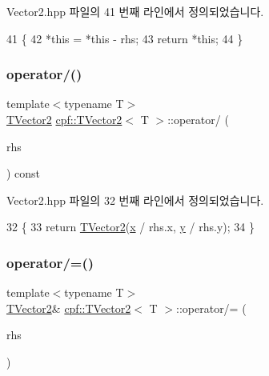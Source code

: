 Vector2.\+hpp 파일의 41 번째 라인에서 정의되었습니다.


\begin{DoxyCode}
41                                                   \{
42             *\textcolor{keyword}{this} = *\textcolor{keyword}{this} - rhs;
43             \textcolor{keywordflow}{return} *\textcolor{keyword}{this};
44         \}
\end{DoxyCode}
\mbox{\label{classcpf_1_1_t_vector2_ae53c4a8c87a80f446e0f7a05a22c4f32}} 
\subsubsection{\texorpdfstring{operator/()}{operator/()}}
{\footnotesize\ttfamily template$<$typename T$>$ \\
\hyperlink{classcpf_1_1_t_vector2}{T\+Vector2} \hyperlink{classcpf_1_1_t_vector2}{cpf\+::\+T\+Vector2}$<$ T $>$\+::operator/ (\begin{DoxyParamCaption}\item[{const \hyperlink{classcpf_1_1_t_vector2}{T\+Vector2}$<$ T $>$ \&}]{rhs }\end{DoxyParamCaption}) const\hspace{0.3cm}{\ttfamily [inline]}}



Vector2.\+hpp 파일의 32 번째 라인에서 정의되었습니다.


\begin{DoxyCode}
32                                                       \{
33             \textcolor{keywordflow}{return} \hyperlink{classcpf_1_1_t_vector2_aaed071ed32aa0e7fb5d8dc15e65aa2e5}{TVector2}(\hyperlink{classcpf_1_1_t_vector2_a2c0ac9258353351f1435070a2307e9e1}{x} / rhs.x, \hyperlink{classcpf_1_1_t_vector2_a727b923b39a876bbb13c810bcf6eecff}{y} / rhs.y);
34         \}
\end{DoxyCode}
\mbox{\label{classcpf_1_1_t_vector2_aa95668b1b19d1aa9a39092a64aee5ef7}} 
\subsubsection{\texorpdfstring{operator/=()}{operator/=()}}
{\footnotesize\ttfamily template$<$typename T$>$ \\
\hyperlink{classcpf_1_1_t_vector2}{T\+Vector2}\& \hyperlink{classcpf_1_1_t_vector2}{cpf\+::\+T\+Vector2}$<$ T $>$\+::operator/= (\begin{DoxyParamCaption}\item[{const \hyperlink{classcpf_1_1_t_vector2}{T\+Vector2}$<$ T $>$ \&}]{rhs }\end{DoxyParamCaption})\hspace{0.3cm}{\ttfamily [inline]}}



